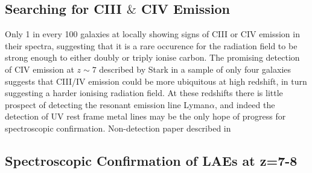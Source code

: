 \documentclass{literature}
\begin{document}
\subsection{Searching for CIII $\&$ CIV Emission}
Only 1 in every 100 galaxies at locally showing signs of CIII or CIV emission in their spectra, suggesting that it is a rare occurence for the radiation field to be strong enough to either doubly or triply ionise carbon. The promising detection of CIV emission at $z \sim 7$ described by Stark \citep{Stark2015} in a sample of only four galaxies suggests that CIII/IV emission could be more ubiquitous at high redshift, in turn suggesting a harder ionising radiation field. At these redshifts there is little prospect of detecting the resonant emission line Lyman$\alpha$, and indeed the detection of UV rest frame metal lines may be the only hope of progress for spectroscopic confirmation. Non-detection paper described in \citep{Zitrin2015}



\subsection{Spectroscopic Confirmation of LAEs at z=7-8}


\clearpage 

%

\end{document}

